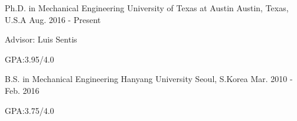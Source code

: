 

\begin{cventries}
  \cventry
    {Ph.D. in Mechanical Engineering} %
    {University of Texas at Austin} %
    {Austin, Texas, U.S.A} %
    {Aug. 2016 - Present} %
    {
      \begin{cvitems} %
        \item{Advisor: Luis Sentis}
        \item {GPA:3.95/4.0}
      \end{cvitems}
    }
  \cventry
    {B.S. in Mechanical Engineering} %
    {Hanyang University} %
    {Seoul, S.Korea} %
    {Mar. 2010 - Feb. 2016} %
    {
      \begin{cvitems} %
        \item {GPA:3.75/4.0}
      \end{cvitems}
    }

\end{cventries}
